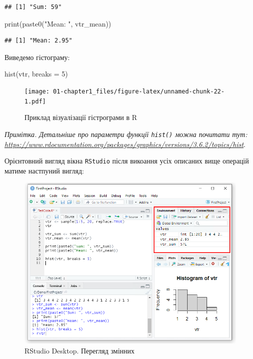 \documentclass[
]{book}
\newenvironment{Shaded}{\begin{snugshade}}{\end{snugshade}}
\newcommand{\AttributeTok}[1]{\textcolor[rgb]{0.77,0.63,0.00}{#1}}
\newcommand{\DecValTok}[1]{\textcolor[rgb]{0.00,0.00,0.81}{#1}}
\newcommand{\FunctionTok}[1]{\textcolor[rgb]{0.00,0.00,0.00}{#1}}
\newcommand{\NormalTok}[1]{#1}
\newcommand{\StringTok}[1]{\textcolor[rgb]{0.31,0.60,0.02}{#1}}
\begin{document}
\begin{verbatim}
## [1] "Sum: 59"
\end{verbatim}

\begin{Shaded}
\begin{Highlighting}[]
\FunctionTok{print}\NormalTok{(}\FunctionTok{paste0}\NormalTok{(}\StringTok{"Mean: "}\NormalTok{, vtr\_mean))}
\end{Highlighting}
\end{Shaded}

\begin{verbatim}
## [1] "Mean: 2.95"
\end{verbatim}

Виведемо гістограму:

\begin{Shaded}
\begin{Highlighting}[]
\FunctionTok{hist}\NormalTok{(vtr, }\AttributeTok{breaks =} \DecValTok{5}\NormalTok{)}
\end{Highlighting}
\end{Shaded}

\begin{figure}
\centering
\texttt{[image: 01-chapter1\_files/figure-latex/unnamed-chunk-22-1.pdf]}
\caption{\label{fig:unnamed-chunk-22}Приклад візуалізації гістрограми в R}
\end{figure}

\emph{Примітка. Детальніше про параметри функції \texttt{hist()} можна почитати тут: \url{https://www.rdocumentation.org/packages/graphics/versions/3.6.2/topics/hist}}.

Орієнтовний вигляд вікна \texttt{RStudio} після викоання усіх описаних вище операцій матиме настпуний вигляд:

\begin{figure}
\includegraphics[width=10.69in]{images/chapter1/rstudio_10} \caption{RStudio Desktop. Перегляд змінних}\label{fig:unnamed-chunk-23}
\end{figure}
\end{document}
